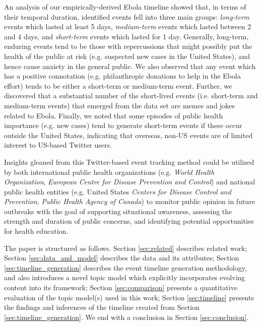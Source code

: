 An analysis of our empirically-derived Ebola timeline showed that, in terms of
their temporal duration,  identified events fell into three main groups:  \emph{long-term} events which
lasted at least 5 days,  \emph{medium-term} events which lasted between
2 and 4 days, and \emph{short-term} events which lasted for 1 day.
Generally,  long-term, enduring events tend to be those with repercussions
that might possibly put the health of the public at risk
(e.g. suspected new cases in the United States), and hence cause
anxiety in the general public.   We also observed
that any event which has a positive connotation (e.g. philanthropic
donations to help in the Ebola effort) tends to be either a
short-term or medium-term event.   Further, we discovered that a
substantial number of the  short-lived events (i.e. short-term and
medium-term events) that emerged from the data set are
memes and jokes related to Ebola.   Finally, we noted that some episodes
of public health importance (e.g. new cases) tend to generate
short-term events if these occur outside the United States,
indicating that overseas, non-US events are of limited interest to US-based
Twitter users.


 Insights gleaned from this 
Twitter-based event tracking method could be utilized by
both international public health organizations (e.g. \emph{World Health
Organization}, \emph{European Centre for Disease Prevention and Control}) and national
public health entities (e.g. United States \emph{Centers for Disease
  Control and Prevention}, \emph{Public Health Agency of Canada})  to
monitor public opinion in future outbreaks with the goal of  supporting situational 
awareness, assessing the strength and duration of public concerns, 
and identifying potential opportunities for health education.

The paper is structured as follows.  Section \ref{sec:related} describes related work;
Section \ref{sec:data_and_model} describes the data and its attributes; Section \ref{sec:timeline_generation} describes
the event timeline generation methodology, and also introduces a novel topic model
which explicitly incorporates evolving content into its framework; Section \ref{sec:comparison}
presents a quantitative evaluation of the topic model(s) used in this work;
Section \ref{sec:timeline} presents the findings and inferences of the timeline created
from Section \ref{sec:timeline_generation}.  We end with a conclusion in Section \ref{sec:conclusion}.

